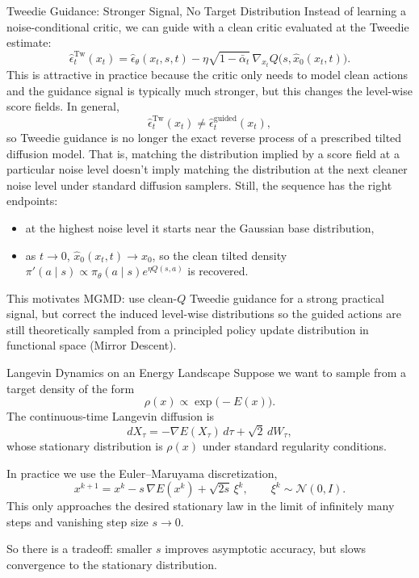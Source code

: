 \documentclass[aspectratio=169,11pt]{beamer}
\begin{document}
\begin{frame}{Tweedie Guidance: Stronger Signal, No Target Distribution}
\small
Instead of learning a noise-conditional critic, we can guide with a clean critic evaluated at the Tweedie estimate:
\[
\hat\epsilon_t^{\mathrm{Tw}}(x_t) = \hat\epsilon_\theta(x_t,s,t) - \eta\sqrt{1-\bar\alpha_t}\,\nabla_{x_t}Q\bigl(s,\hat x_0(x_t,t)\bigr).
\]
This is attractive in practice because the critic only needs to model clean actions and the guidance signal is typically much stronger, but this changes the level-wise score fields. In general,
\[
\hat\epsilon_t^{\mathrm{Tw}}(x_t) \neq \hat\epsilon_t^{\mathrm{guided}}(x_t),
\]
so Tweedie guidance is no longer the exact reverse process of a prescribed tilted diffusion model. That is, matching the distribution implied by a score field at a particular noise level doesn't imply matching the distribution at the next cleaner noise level under standard diffusion samplers. Still, the sequence has the right endpoints:
\begin{itemize}
  \item at the highest noise level it starts near the Gaussian base distribution,
  \item as $t\to 0$, $\hat x_0(x_t,t)\to x_0$, so the clean tilted density $\pi'(a\mid s)\propto \pi_\theta(a\mid s)e^{\eta Q(s,a)}$ is recovered.
\end{itemize}
This motivates MGMD: use clean-$Q$ Tweedie guidance for a strong practical signal, but correct the induced level-wise distributions so the guided actions are still theoretically sampled from a principled policy update distribution in functional space (Mirror Descent).
\end{frame}

\begin{frame}{Langevin Dynamics on an Energy Landscape}
\small
Suppose we want to sample from a target density of the form
\[
\rho(x) \propto \exp\!\bigl(-E(x)\bigr).
\]
The continuous-time Langevin diffusion is
\[
dX_\tau = -\nabla E(X_\tau)\,d\tau + \sqrt{2}\,dW_\tau,
\]
whose stationary distribution is $\rho(x)$ under standard regularity conditions.

\medskip
In practice we use the Euler--Maruyama discretization,
\[
x^{k+1} = x^k - s\,\nabla E(x^k) + \sqrt{2s}\,\xi^k,
\qquad \xi^k\sim\mathcal{N}(0,I).
\]
This only approaches the desired stationary law in the limit of infinitely many steps and vanishing step size $s\to 0$.

\medskip
So there is a tradeoff: smaller $s$ improves asymptotic accuracy, but slows convergence to the stationary distribution.
\end{frame}
\end{document}
